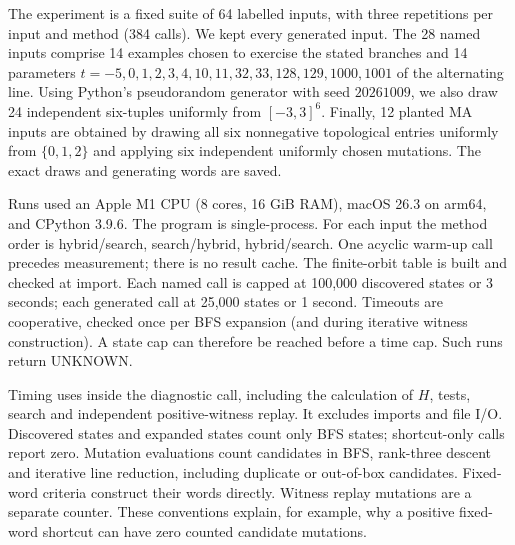 The experiment is a fixed suite of 64 labelled inputs, with three repetitions per input and method (384 calls). We kept every generated input. The 28 named inputs comprise 14 examples chosen to exercise the stated branches and 14 parameters $t=-5,0,1,2,3,4,10,11,32,33,128,129,1000,1001$ of the alternating line. Using Python's pseudorandom generator with seed $20261009$, we also draw 24 independent six-tuples uniformly from $[-3,3]^6$. Finally, 12 planted MA inputs are obtained by drawing all six nonnegative topological entries uniformly from $\{0,1,2\}$ and applying six independent uniformly chosen mutations. The exact draws and generating words are saved.

Runs used an Apple M1 CPU (8 cores, 16 GiB RAM), macOS 26.3 on arm64, and CPython 3.9.6. The program is single-process. For each input the method order is hybrid/search, search/hybrid, hybrid/search. One acyclic warm-up call precedes measurement; there is no result cache. The finite-orbit table is built and checked at import. Each named call is capped at 100,000 discovered states or 3 seconds; each generated call at 25,000 states or 1 second. Timeouts are cooperative, checked once per BFS expansion (and during iterative witness construction). A state cap can therefore be reached before a time cap. Such runs return UNKNOWN.

Timing uses  inside the diagnostic call, including the calculation of $H$, tests, search and independent positive-witness replay. It excludes imports and file I/O. Discovered states and expanded states count only BFS states; shortcut-only calls report zero. Mutation evaluations count candidates in BFS, rank-three descent and iterative line reduction, including duplicate or out-of-box candidates. Fixed-word criteria construct their words directly. Witness replay mutations are a separate counter. These conventions explain, for example, why a positive fixed-word shortcut can have zero counted candidate mutations.

